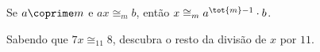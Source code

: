 \begin{theorem}
	Se $a \coprime m$ e $ax \cong_{m} b$, então $x \cong_{m} a^{\tot{m}-1}\cdot b$.
\end{theorem}

\begin{exercise}

	Sabendo que $7x \cong_{11} 8$, descubra o resto da divisão de $x$ por $11$.
\end{exercise}
